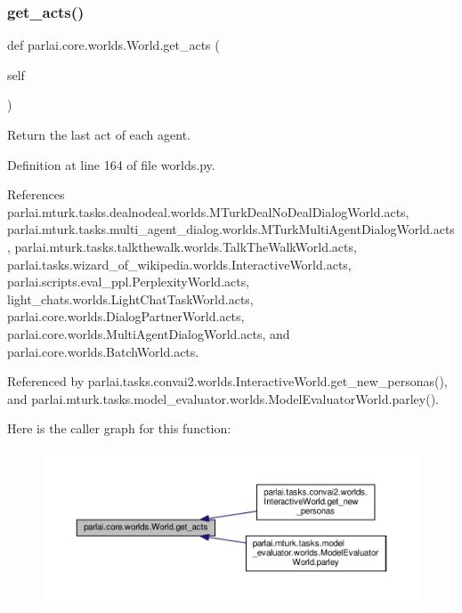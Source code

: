 \subsubsection{\texorpdfstring{get\+\_\+acts()}{get\_acts()}}
{\footnotesize\ttfamily def parlai.\+core.\+worlds.\+World.\+get\+\_\+acts (\begin{DoxyParamCaption}\item[{}]{self }\end{DoxyParamCaption})}

\begin{DoxyVerb}Return the last act of each agent.\end{DoxyVerb}
 

Definition at line 164 of file worlds.\+py.



References parlai.\+mturk.\+tasks.\+dealnodeal.\+worlds.\+M\+Turk\+Deal\+No\+Deal\+Dialog\+World.\+acts, parlai.\+mturk.\+tasks.\+multi\+\_\+agent\+\_\+dialog.\+worlds.\+M\+Turk\+Multi\+Agent\+Dialog\+World.\+acts, parlai.\+mturk.\+tasks.\+talkthewalk.\+worlds.\+Talk\+The\+Walk\+World.\+acts, parlai.\+tasks.\+wizard\+\_\+of\+\_\+wikipedia.\+worlds.\+Interactive\+World.\+acts, parlai.\+scripts.\+eval\+\_\+ppl.\+Perplexity\+World.\+acts, light\+\_\+chats.\+worlds.\+Light\+Chat\+Task\+World.\+acts, parlai.\+core.\+worlds.\+Dialog\+Partner\+World.\+acts, parlai.\+core.\+worlds.\+Multi\+Agent\+Dialog\+World.\+acts, and parlai.\+core.\+worlds.\+Batch\+World.\+acts.



Referenced by parlai.\+tasks.\+convai2.\+worlds.\+Interactive\+World.\+get\+\_\+new\+\_\+personas(), and parlai.\+mturk.\+tasks.\+model\+\_\+evaluator.\+worlds.\+Model\+Evaluator\+World.\+parley().

Here is the caller graph for this function\+:
\nopagebreak
\begin{figure}[H]
\begin{center}
\leavevmode
\includegraphics[width=350pt]{classparlai_1_1core_1_1worlds_1_1World_aa1d3c0cc946f5ade27373f7dc0bd77b5_icgraph}
\end{center}
\end{figure}
\mbox{\label{classparlai_1_1core_1_1worlds_1_1World_a1c74e607d064c5823e56b23b21ce17f0}} 
